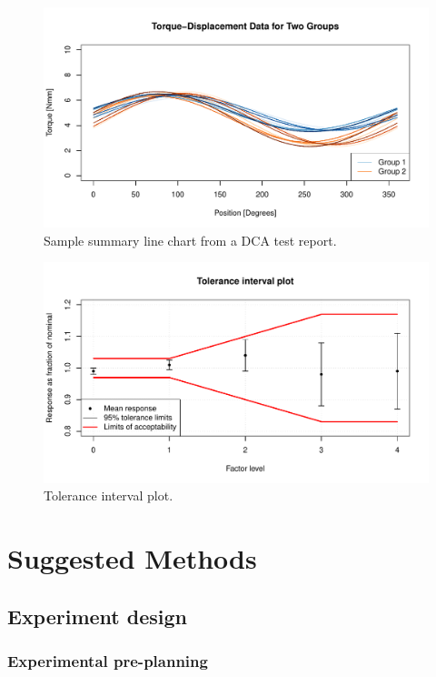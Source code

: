 \documentclass[11pt,a4paper,article]{memoir} %
\begin{document}
\begin{figure}
	\includegraphics[width=\textwidth]{overlaid_line_chart.pdf}
	\caption{Sample summary line chart from a DCA test report.}
	\label{fig:line_plots}
\end{figure}
\begin{figure}
	\includegraphics[width=\textwidth]{tolerance_intervals_plot.pdf}
	\caption{Tolerance interval plot.}
	\label{fig:tolerance_intervals_plot}
\end{figure}

\chapter{Suggested Methods}\label{suggested_methods}
\section{Experiment design}
\subsection*{Experimental pre-planning}
\end{document}
